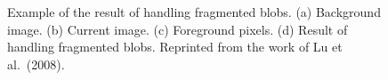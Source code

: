 \begin{figure}[t]
{  \label{fig:blob-clustering03}}
  \hspace{0.01in}
  \caption[Example of the result of handling fragmented
  blobs.]{Example of the result of handling fragmented blobs. (a)
  Background image. (b) Current image. (c) Foreground pixels. (d)
  Result of handling fragmented blobs. Reprinted from the work of Lu
  et al.\ (2008).}
  \label{fig:blob-clustering-result}
\end{figure}

